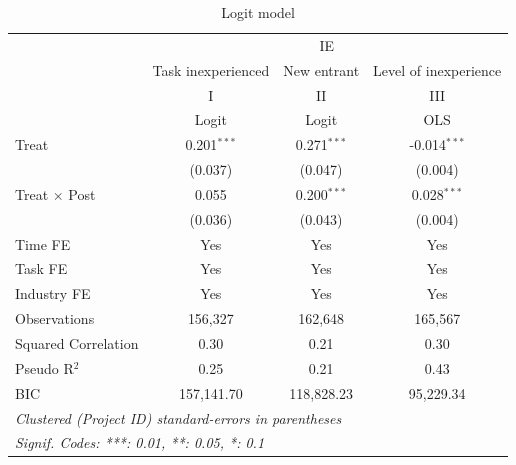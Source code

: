 \documentclass[
]{article}
\begin{document}
\begin{table}[htbp]
   \caption{Logit model}
   \centering
   \small
   \begin{tabular}{lccc}
      \toprule
       & \multicolumn{3}{c}{IE}\\
                           & Task inexperienced & New entrant   & Level of inexperience \\   
                           & I                  & II            & III\\  
                           &  Logit             & Logit         & OLS\\  
      Treat                & 0.201$^{***}$      & 0.271$^{***}$ & -0.014$^{***}$\\   
                           & (0.037)            & (0.047)       & (0.004)\\   
      Treat $\times$ Post  & 0.055              & 0.200$^{***}$ & 0.028$^{***}$\\   
                           & (0.036)            & (0.043)       & (0.004)\\   
      Time FE              & Yes                & Yes           & Yes\\  
      Task FE              & Yes                & Yes           & Yes\\  
      Industry FE          & Yes                & Yes           & Yes\\  
      Observations         & 156,327            & 162,648       & 165,567\\  
      Squared Correlation  & 0.30               & 0.21          & 0.30\\  
      Pseudo R$^2$         & 0.25               & 0.21          & 0.43\\  
      BIC                  & 157,141.70         & 118,828.23    & 95,229.34\\  
      \midrule
      \multicolumn{4}{l}{\emph{Clustered (Project ID) standard-errors in parentheses}}\\
      \multicolumn{4}{l}{\emph{Signif. Codes: ***: 0.01, **: 0.05, *: 0.1}}\\
   \end{tabular}
\end{table}
\begingroup
\centering
\small
\end{document}
